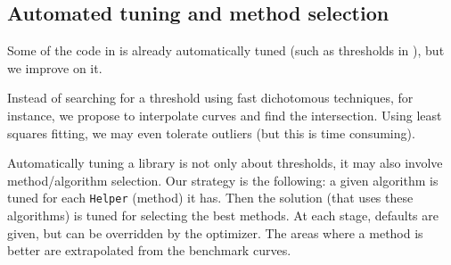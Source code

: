 \subsection{Automated tuning and method selection}
%
Some of the code in \linbox is already automatically tuned (such as thresholds
in \fgemm), but we improve on it. 



Instead of searching for a
threshold using fast dichotomous techniques, for instance, we propose to
interpolate curves and find the intersection. Using least squares fitting, we
may even tolerate outliers (but this is time consuming).
%
\par
%
Automatically tuning a library is not only about thresholds, it may 
also involve method/algorithm selection. Our strategy is the following: a given
algorithm is tuned for each {\tt Helper} (method) it has.  Then the solution
(that uses these algorithms) is tuned for selecting the best methods.  At each
stage, defaults are given, but can be overridden by the optimizer. The areas
where a method is better are extrapolated from the benchmark curves.
